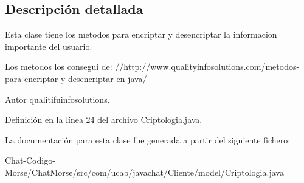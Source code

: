 \subsection{Descripción detallada}
Esta clase tiene los metodos para encriptar y desencriptar la informacion importante del usuario.

Los metodos los consegui de\-: //http\-://www.qualityinfosolutions.\-com/metodos-\/para-\/encriptar-\/y-\/desencriptar-\/en-\/java/

\begin{DoxyAuthor}{Autor}
qualitifuinfosolutions. 
\end{DoxyAuthor}


Definición en la línea 24 del archivo Criptologia.\-java.



La documentación para esta clase fue generada a partir del siguiente fichero\-:\begin{DoxyCompactItemize}
\item 
Chat-\/\-Codigo-\/\-Morse/\-Chat\-Morse/src/com/ucab/javachat/\-Cliente/model/Criptologia.\-java\end{DoxyCompactItemize}
